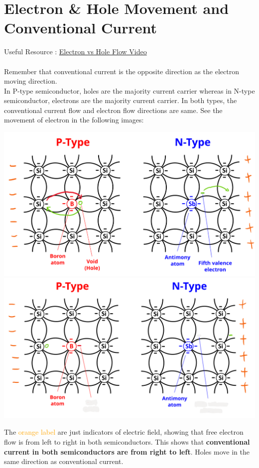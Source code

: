 \documentclass{article}
\begin{document}
	 \section{Electron \& Hole Movement and Conventional Current}
	 	Useful Resource : \href{https://www.youtube.com/watch?v=QpqDBq9zxw4&ab_channel=NesoAcademy}{Electron vs Hole Flow Video}\\\\
	 	Remember that conventional current is the opposite direction as the electron moving direction.\\
	 	In P-type semiconductor, holes are the majority current carrier whereas in N-type semiconductor, electrons are the majority current carrier. In both types, the conventional current flow and electron flow directions are same. See the movement of electron in the following images:
	 	\begin{center}
	 		\includegraphics[width=\textwidth]{img/current_flow_1.png}
	 		\includegraphics[width=\textwidth]{img/current_flow_2.png}
	 	\end{center}
	 	The \textcolor{orange}{orange label} are just indicators of electric field, showing that free electron flow is from left to right in both semiconductors. This shows that \textbf{conventional current in both semiconductors are from right to left}. Holes move in the same direction as conventional current.\\
\end{document}
